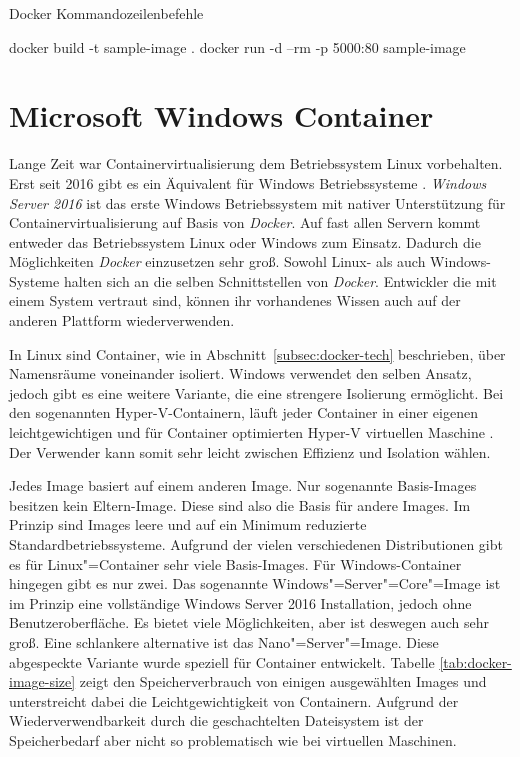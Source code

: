\begin{program}[!hbt]
\caption{Docker Kommandozeilenbefehle}
\label{prog:dockercommands}
\begin{GenericCode}
docker build -t sample-image .
docker run -d --rm -p 5000:80 sample-image
\end{GenericCode}
\end{program}

\section{Microsoft Windows Container}

Lange Zeit war Containervirtualisierung dem Betriebssystem Linux vorbehalten. Erst seit 2016 gibt es ein Äquivalent für Windows Betriebssysteme \cite{WinSerCont}. \textit{Windows Server 2016} ist das erste Windows Betriebssystem mit nativer Unterstützung für Containervirtualisierung auf Basis von \textit{Docker}. Auf fast allen Servern kommt entweder das Betriebssystem Linux oder Windows zum Einsatz. Dadurch die Möglichkeiten \textit{Docker} einzusetzen sehr groß. Sowohl Linux- als auch Windows-Systeme halten sich an die selben Schnittstellen von \textit{Docker}. Entwickler die mit einem System vertraut sind, können ihr vorhandenes Wissen auch auf der anderen Plattform wiederverwenden.

In Linux sind Container, wie in Abschnitt~\ref{subsec:docker-tech} beschrieben, über Namensräume voneinander isoliert. Windows verwendet den selben Ansatz, jedoch gibt es eine weitere Variante, die eine strengere Isolierung ermöglicht. Bei den sogenannten Hyper-V-Containern, läuft jeder Container in einer eigenen leichtgewichtigen und für Container optimierten Hyper-V virtuellen Maschine \cite{WinConHyperV}. Der Verwender kann somit sehr leicht zwischen Effizienz und Isolation wählen.

Jedes Image basiert auf einem anderen Image. Nur sogenannte Basis-Images besitzen kein Eltern-Image. Diese sind also die Basis für andere Images. Im Prinzip sind Images leere und auf ein Minimum reduzierte Standardbetriebssysteme. Aufgrund der vielen verschiedenen Distributionen gibt es für Linux"=Container sehr viele Basis-Images. Für Windows-Container hingegen gibt es nur zwei. Das sogenannte Windows"=Server"=Core"=Image ist im Prinzip eine vollständige Windows Server 2016 Installation, jedoch ohne Benutzeroberfläche. Es bietet viele Möglichkeiten, aber ist deswegen auch sehr groß. Eine schlankere alternative ist das Nano"=Server"=Image. Diese abgespeckte Variante wurde speziell für Container entwickelt. Tabelle \ref{tab:docker-image-size} zeigt den Speicherverbrauch von einigen ausgewählten Images und unterstreicht dabei die Leichtgewichtigkeit von Containern. Aufgrund der Wiederverwendbarkeit durch die geschachtelten Dateisystem ist der Speicherbedarf aber nicht so problematisch wie bei virtuellen Maschinen.

